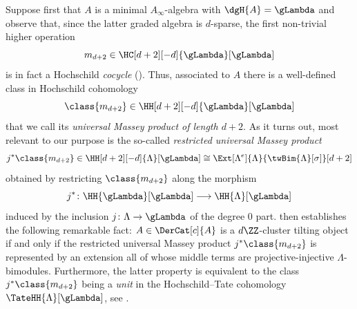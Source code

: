 \documentclass[a4paper]{amsart}
\begin{document}
Suppose first that $A$ is a minimal $A_\infty$-algebra with $\dgH{A}=\gLambda$
and observe that, since the latter graded algebra is $d$-sparse, the first
non-trivial higher operation
\[
  m_{d+2}\in\HC[d+2][-d]{\gLambda}[\gLambda]
\]
is in fact a Hochschild \emph{cocycle} ().
Thus, associated to $A$ there is a well-defined class in Hochschild cohomology
\[
  \class{m_{d+2}}\in\HH[d+2][-d]{\gLambda}[\gLambda]
\]
that we call its \emph{universal Massey product of length $d+2$}. As it turns
out, most relevant to our purpose is the so-called \emph{restricted universal
  Massey product}
\[
  j^*\class{m_{d+2}}\in\HH[d+2][-d]{\Lambda}[\gLambda]\cong\Ext[\Lambda^e]{\Lambda}{\twBim{\Lambda}[\sigma]}[d+2]
\]
obtained by restricting $\class{m_{d+2}}$ along the morphism
\[
  j^*\colon\HH{\gLambda}[\gLambda]\longrightarrow\HH{\Lambda}[\gLambda]
\]
induced by the inclusion $j\colon\Lambda\to\gLambda$ of the degree $0$ part.
 then establishes the following remarkable fact:
$A\in\DerCat[c]{A}$ is a $d\ZZ$-cluster tilting object if and only if the
restricted universal Massey product $j^*\class{m_{d+2}}$ is represented by an
extension all of whose middle terms are projective-injective
$\Lambda$-bimodules. Furthermore, the latter property is equivalent to the class
$j^*\class{m_{d+2}}$ being a \emph{unit} in the Hochschild--Tate cohomology 
$\TateHH{\Lambda}[\gLambda]$, see .
\end{document}
